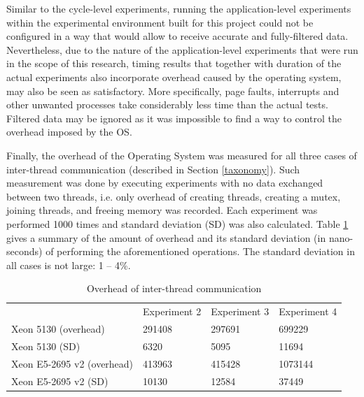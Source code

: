 

Similar to the cycle-level experiments, running the application-level experiments within the experimental environment built for this project could not be configured in a way that would allow to receive accurate and fully-filtered data. Nevertheless, due to the nature of the application-level experiments that were run in the scope of this research, timing results that together with duration of the actual experiments also incorporate overhead caused by the operating system, may also be seen as satisfactory. More specifically, page faults, interrupts and other unwanted processes take considerably less time than the actual tests. Filtered data may be ignored as it was impossible to find a way to control the overhead imposed by the OS.

Finally, the overhead of the Operating System was measured for all three cases of inter-thread communication (described in Section \ref{taxonomy}). Such measurement was done by executing experiments with no data exchanged between two threads, i.e. only overhead of creating threads, creating a mutex, joining threads, and freeing memory was recorded. Each experiment was performed 1000 times and standard deviation (SD) was also calculated. Table \ref{overheadTable} gives a summary of the amount of overhead and its standard deviation (in nano-seconds) of performing the aforementioned operations. The standard deviation in all cases is not large: 1 -- 4\%.

\begin{table}
\caption{Overhead of inter-thread communication}
\centering 
\begin{tabular}{llll}
             & Experiment 2 & Experiment 3 & Experiment 4 \\
Xeon 5130 (overhead) & 291408       & 297691       & 699229       \\
Xeon 5130 (SD) & 6320      & 5095       & 11694      \\
Xeon E5-2695 v2 (overhead) & 413963       & 415428       & 1073144 \\
Xeon E5-2695 v2 (SD) & 10130       & 12584       & 37449 
\end{tabular}
\label{overheadTable}
\end{table}

